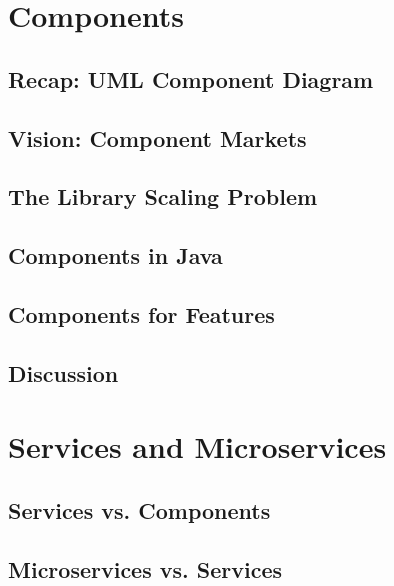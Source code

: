 \documentclass[
	aspectratio=169, %
	8pt, %
	handout, %
]{beamer}
\subtitle{6. Modular Features}
\author{Timo Kehrer, Thomas Thüm, Elias Kuiter}
\begin{document}


\section{Components}


\subsection{Recap: UML Component Diagram}
\subsection{Vision: Component Markets}
\subsection{The Library Scaling Problem}
\subsection{Components in Java}
\subsection{Components for Features}
\subsection{Discussion}

\lessonslearned{
	\item \ldots
}{
	\item \ldots
}{
	\ldots
}

\sectionend

\section{Services and Microservices}

\subsection{Services vs. Components}
\subsection{Microservices vs. Services}

\lessonslearned{
	\item \ldots
}{
	\item \ldots
}{
	\ldots
}
\end{document}
